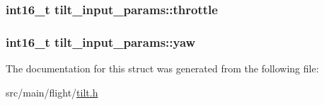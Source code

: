 \hypertarget{structtilt__input__params_a254114b08c48543c13f873c2a73914d3}{
\subsubsection[{throttle}]{\setlength{\rightskip}{0pt plus 5cm}int16\+\_\+t tilt\+\_\+input\+\_\+params\+::throttle}}\label{structtilt__input__params_a254114b08c48543c13f873c2a73914d3}
\hypertarget{structtilt__input__params_a98d24d8dbe2bf223ab7ed01b7b28abf8}{
\subsubsection[{yaw}]{\setlength{\rightskip}{0pt plus 5cm}int16\+\_\+t tilt\+\_\+input\+\_\+params\+::yaw}}\label{structtilt__input__params_a98d24d8dbe2bf223ab7ed01b7b28abf8}


The documentation for this struct was generated from the following file\+:\begin{DoxyCompactItemize}
\item 
src/main/flight/\hyperlink{flight_2tilt_8h}{tilt.\+h}\end{DoxyCompactItemize}
